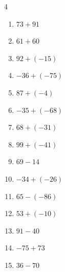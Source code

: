 \begin{multicols}{4}
\begin{enumerate}
        \phantom{$=-31$}

  \item $73+91$

        \phantom{$=164$}

  \item $61+60$

        \phantom{$=121$}

  \item $92+(-15)$

        \phantom{$=77$}

  \item $-36+(-75)$

        \phantom{$=-111$}

  \item $87+(-4)$

        \phantom{$=83$}

  \item $-35+(-68)$

        \phantom{$=-103$}

  \item $68+(-31)$

        \phantom{$=37$}

  \item $99+(-41)$

        \phantom{$=58$}

\columnbreak %

\resetques

  \item $69-14$

        \phantom{$=55$}

  \item $-34+(-26)$

        \phantom{$=-60$}

  \item $65-(-86)$

        \phantom{$=151$}

  \item $53+(-10)$

        \phantom{$=43$}

  \item $91-40$

        \phantom{$=51$}

  \item $-75+73$

        \phantom{$=-2$}

  \item $36-70$

        \phantom{$=-34$}


\end{enumerate}
\end{multicols}
